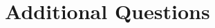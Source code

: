 \documentclass[12pt,letterpaper]{exam}
\begin{document}
\section*{Additional Questions}

\end{document}
